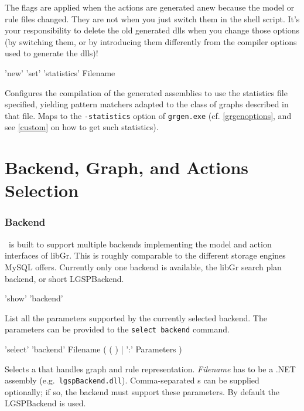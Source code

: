 The flags are applied when the actions are generated anew because the model or rule files changed. They are not when you just switch them in the shell script. It's your responsibility to delete the old generated dlls when you change those options (by switching them, or by introducing them differently from the compiler options used to generate the dlls)!

\begin{rail}
  'new' 'set' 'statistics' Filename
\end{rail}
Configures the compilation of the generated assemblies to use the statistics file specified, yielding pattern matchers adapted to the class of graphs described in that file.
Maps to the \texttt{-statistics} option of \texttt{grgen.exe} (cf. \ref{grgenoptions}, and see \ref{custom} on how to get such statistics).


\section{Backend, Graph, and Actions Selection}\label{backend}

\subsubsection*{Backend}
\GrG\ is built to support multiple backends implementing the model and action interfaces of libGr.
This is roughly comparable to the different storage engines MySQL offers.
Currently only one backend is available, the libGr search plan backend, or short LGSPBackend.

\begin{rail}
  'show' 'backend'
\end{rail}\nopagebreak{}
List all the parameters supported by the currently selected backend.
The parameters can be provided to the \texttt{select backend} command.

\begin{rail}
  'select' 'backend' Filename ( ( ) | ':' Parameters )
\end{rail}
Selects a  that handles graph and rule representation.
\emph{Filename} has to be a .NET assembly (e.g.\ \texttt{lgspBackend.dll}).
Comma-separated s can be supplied optionally; if so, the backend must support these parameters.
By default the LGSPBackend is used.


